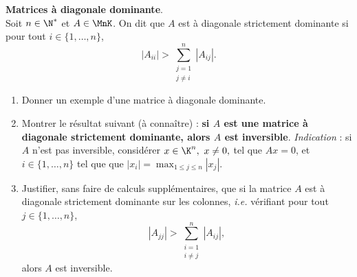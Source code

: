 \begin{exo}{\bf Matrices à diagonale dominante}.\ \\
  Soit $n\in\N^*$ et $A\in\MnK$. On dit que $A$ est à diagonale strictement dominante si pour tout $i\in\{1,\dots,n\}$,
  $$
|A_{ii}|>\sum_{\substack{j=1\\j\neq i}}^n|A_{ij}|.
  $$
  \begin{enumerate}
    \item Donner un exemple d'une matrice à diagonale dominante.
    \item Montrer le résultat suivant (à connaître) : {\bf si $A$ est une matrice à diagonale strictement dominante, alors $A$ est inversible}.  
      {\it Indication} : si $A$ n'est pas inversible, considérer $x\in\K^n,\ x\neq0,$ tel que $Ax=0$, et $i\in\{1,\dots,n\}$ tel que que $|x_i|=\displaystyle{\max_{1\leq j\leq n}|x_j|}$.

    \item Justifier, sans faire de calculs supplémentaires, que si la matrice $A$ est à diagonale strictement dominante sur les colonnes, {\it i.e.} vérifiant pour tout $j\in\{1,\dots,n\}$,
  $$
|A_{jj}|>\sum_{\substack{i=1\\i\neq j}}^n|A_{ij}|,
  $$
  alors $A$ est inversible.
  \end{enumerate}
\end{exo}


